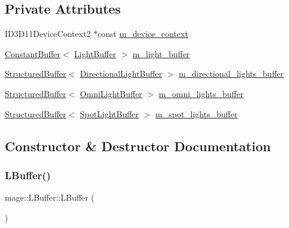\subsection*{Private Attributes}
\begin{DoxyCompactItemize}
\item 
I\+D3\+D11\+Device\+Context2 $\ast$const \hyperlink{structmage_1_1_l_buffer_a51538e4167fe078e96ab4d0c17d08ace}{m\+\_\+device\+\_\+context}
\item 
\hyperlink{structmage_1_1_constant_buffer}{Constant\+Buffer}$<$ \hyperlink{structmage_1_1_light_buffer}{Light\+Buffer} $>$ \hyperlink{structmage_1_1_l_buffer_afb068c9b4bfb5fe5415de2c94e777d85}{m\+\_\+light\+\_\+buffer}
\item 
\hyperlink{structmage_1_1_structured_buffer}{Structured\+Buffer}$<$ \hyperlink{structmage_1_1_directional_light_buffer}{Directional\+Light\+Buffer} $>$ \hyperlink{structmage_1_1_l_buffer_a4b371bb973c96287d7a2677b0261616e}{m\+\_\+directional\+\_\+lights\+\_\+buffer}
\item 
\hyperlink{structmage_1_1_structured_buffer}{Structured\+Buffer}$<$ \hyperlink{structmage_1_1_omni_light_buffer}{Omni\+Light\+Buffer} $>$ \hyperlink{structmage_1_1_l_buffer_ae7b986fae62c58aa27bd854c7eccec5c}{m\+\_\+omni\+\_\+lights\+\_\+buffer}
\item 
\hyperlink{structmage_1_1_structured_buffer}{Structured\+Buffer}$<$ \hyperlink{structmage_1_1_spot_light_buffer}{Spot\+Light\+Buffer} $>$ \hyperlink{structmage_1_1_l_buffer_a427d547154709acf94cb10d1e19ac8f2}{m\+\_\+spot\+\_\+lights\+\_\+buffer}
\end{DoxyCompactItemize}


\subsection{Constructor \& Destructor Documentation}
\hypertarget{structmage_1_1_l_buffer_ae77361126bdfd7ea54d51f8b6bb73e16}{}\label{structmage_1_1_l_buffer_ae77361126bdfd7ea54d51f8b6bb73e16} 
\subsubsection{\texorpdfstring{L\+Buffer()}{LBuffer()}\hspace{0.1cm}{\footnotesize\ttfamily [1/3]}}
{\footnotesize\ttfamily mage\+::\+L\+Buffer\+::\+L\+Buffer (\begin{DoxyParamCaption}{ }\end{DoxyParamCaption})}

